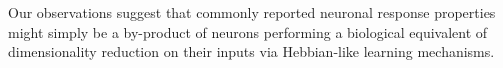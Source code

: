 Our observations suggest that 
commonly reported neuronal response properties might simply be a 
by-product of neurons performing a biological equivalent of 
dimensionality reduction on their inputs 
via Hebbian-like learning mechanisms.





